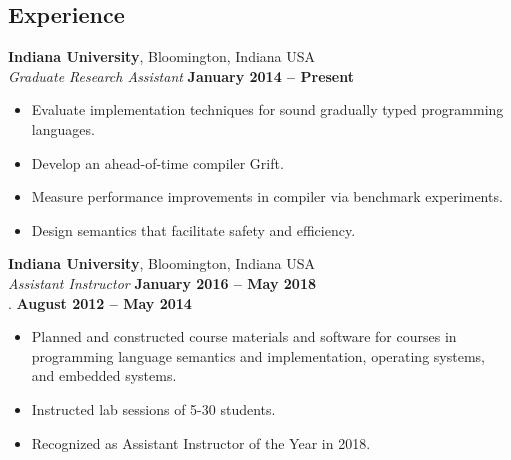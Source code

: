 \documentclass[resmargin,line]{res}
\newenvironment{list1}{
  \begin{list}{\ding{113}}{%
      \setlength{\itemsep}{0in}
      \setlength{\parsep}{0in} \setlength{\parskip}{0in}
      \setlength{\topsep}{0in} \setlength{\partopsep}{0in} 
      \setlength{\leftmargin}{0.17in}}}{\end{list}}
\begin{document}
\begin{resume}


\section{\sc Experience}
{\bf Indiana University}, Bloomington, Indiana USA\\
{\em Graduate Research Assistant} \hfill {\bf January 2014 -- Present}\\
%
\begin{itemize}
\vspace*{-.3cm}
\item Evaluate implementation techniques for sound gradually typed
  programming languages.
\item Develop an ahead-of-time compiler Grift.
\item Measure performance improvements in compiler via benchmark experiments.
\item Design semantics that facilitate safety and efficiency.
\end{itemize}

{\bf Indiana University}, Bloomington, Indiana USA\\
{\em Assistant Instructor} \hfill {\bf January 2016 -- May 2018}\\
{\color{white} . } \quad \hfill {\bf August 2012 -- May 2014}\\
%
\begin{itemize}
\vspace*{-.35cm}
\item Planned and constructed course materials and software for
  courses in programming language semantics and implementation,
  operating systems, and embedded systems.
\item Instructed lab sessions of 5-30 students.
\item Recognized as Assistant Instructor of the Year in 2018.
\end{itemize}
%



\end{resume}
\end{document}
